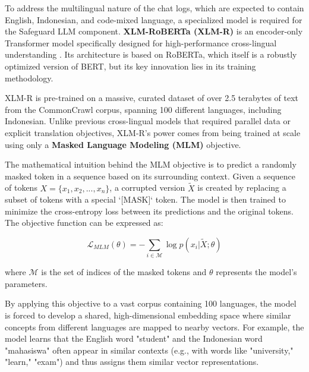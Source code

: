 To address the multilingual nature of the chat logs, which are expected to contain English, Indonesian, and code-mixed language, a specialized model is required for the Safeguard LLM component. \textbf{XLM-RoBERTa (XLM-R)} is an encoder-only Transformer model specifically designed for high-performance cross-lingual understanding \cite{FIND_CITATION_PLEASE}. Its architecture is based on RoBERTa, which itself is a robustly optimized version of BERT, but its key innovation lies in its training methodology.

XLM-R is pre-trained on a massive, curated dataset of over 2.5 terabytes of text from the CommonCrawl corpus, spanning 100 different languages, including Indonesian. Unlike previous cross-lingual models that required parallel data or explicit translation objectives, XLM-R's power comes from being trained at scale using only a \textbf{Masked Language Modeling (MLM)} objective.

The mathematical intuition behind the MLM objective is to predict a randomly masked token in a sequence based on its surrounding context. Given a sequence of tokens $X = \{x_1, x_2, ..., x_n\}$, a corrupted version $\tilde{X}$ is created by replacing a subset of tokens with a special `[MASK]` token. The model is then trained to minimize the cross-entropy loss between its predictions and the original tokens. The objective function can be expressed as:

$$ \mathcal{L}_{MLM}(\theta) = - \sum_{i \in \mathcal{M}} \log p(x_i | \tilde{X}; \theta) $$

where $\mathcal{M}$ is the set of indices of the masked tokens and $\theta$ represents the model's parameters.

By applying this objective to a vast corpus containing 100 languages, the model is forced to develop a shared, high-dimensional embedding space where similar concepts from different languages are mapped to nearby vectors. For example, the model learns that the English word "student" and the Indonesian word "mahasiswa" often appear in similar contexts (e.g., with words like "university," "learn," "exam") and thus assigns them similar vector representations.


